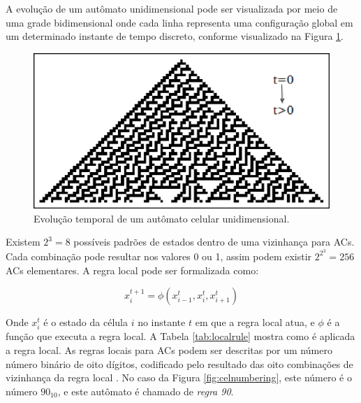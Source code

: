 \documentclass[12pt,a4paper]{article}
\begin{document}
A evolução de um autômato unidimensional pode ser visualizada por meio de uma grade bidimensional
onde cada linha representa uma configuração global em um determinado instante de tempo discreto,
conforme visualizado na Figura \ref{fig:celautomaton}.

\begin{figure}[htp]
\begin{center}
\includegraphics[scale=0.8]{img/CellularAutomaton.eps}
\caption{Evolução temporal de um autômato celular unidimensional.}
\label{fig:celautomaton}
\end{center}
\end{figure}

Existem $2^3=8$ possíveis padrões de estados dentro de uma vizinhança para ACs.
Cada combinação pode resultar nos valores 0 ou 1, assim podem existir $2^{2^3}=256$ ACs
elementares. A regra local pode ser formalizada como:

\begin{equation}
x^{t+1}_i = \phi(x^t_{i-1}, x^t_i, x^t_{i+1})
\end{equation}

Onde $x^t_i$ é o estado da célula $i$ no instante $t$ em que a regra local atua, e $\phi$ é a função
que executa a regra local.  A Tabela \ref{tab:localrule} mostra como é aplicada a regra local.
As regras locais para ACs podem ser descritas por um número número binário de
oito dígitos, codificado pelo resultado das oito combinações de vizinhança da regra local
. No caso da Figura \ref{fig:celnumbering}, este número é o número $90_{10}$, e
este autômato é chamado de \textit{regra 90}.
\end{document}
